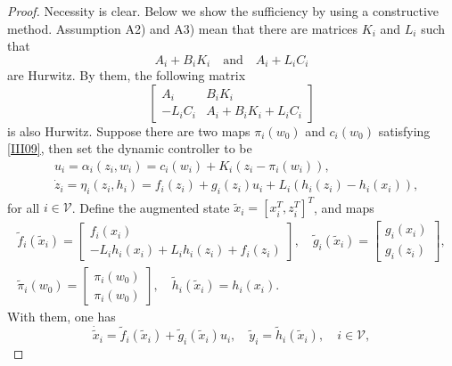 \documentclass[onecolumn,a4paper,12pt]{article}
\numberwithin{equation}{section}
\begin{document}
\begin{proof}
Necessity is clear. Below we show the sufficiency by using a constructive method. Assumption A2) and A3) mean that there are matrices $K_i$ and $L_i$ such that
\setcounter{equation}{21}
\begin{equation}
  A_i+B_iK_i \quad \mbox{and}\quad A_i+L_iC_i
\end{equation}
are Hurwitz. By them, the following matrix
\begin{equation} \label{III23}
  \begin{bmatrix}
    A_i & B_iK_i \\
    -L_iC_i & A_i+B_iK_i+L_iC_i
  \end{bmatrix}
\end{equation}
is also Hurwitz. Suppose there are two maps $\pi_i(w_0)$ and $c_i(w_0)$ satisfying \eqref{III09}, then set the dynamic controller to be
\begin{subequations} \label{III24}
\begin{align}
&u_i=\alpha_i(z_i,w_i)=c_i(w_i)+K_i(z_i-\pi_i(w_i)), \label{III24a}\\
&\dot{z}_{i}=\eta_i(z_i,h_i)=f_i(z_{i})+g_i(z_{i})u_i+L_i(h_i(z_i)-h_i(x_i)), \label{III24b}
\end{align}
\end{subequations}
for all $i\in\mathcal{V}$. Define the augmented state $\tilde{x}_i = [x_i^T, z_i^T]^T$, and maps
\begin{gather}
  \label{III25}
  \tilde{f}_i({\tilde{x}_i})=\begin{bmatrix}
    f_i(x_i)\\
    -L_ih_i(x_i)+L_ih_i(z_i)+f_i(z_i)
  \end{bmatrix}, \quad \tilde{g}_i(\tilde{x}_i)=\begin{bmatrix}
    g_i(x_i) \\ g_i(z_i)
  \end{bmatrix}, \nonumber \\
  \tilde{\pi}_i(w_0)=\begin{bmatrix}
    \pi_i(w_0) \\ \pi_i(w_0)
  \end{bmatrix}, \quad \tilde{h}_i(\tilde{x}_i)=h_i(x_i).
\end{gather}
With them, one has
\begin{equation} \label{III26}
  \dot{\tilde{x}}_i = \tilde{f}_i(\tilde{x}_i)+\tilde{g}_i(\tilde{x}_i)u_i, \quad \tilde{y}_i=\tilde{h}_i(\tilde{x}_i), \quad i\in\mathcal{V},
\end{equation}

\end{proof}
\end{document}
